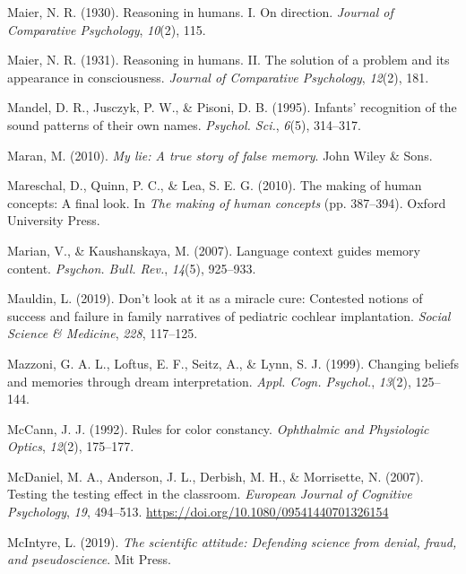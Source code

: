 \documentclass[
]{krantz}
\newlength{\cslhangindent}
\newenvironment{CSLReferences}[2] %
 {\begin{list}{}{%
  \setlength{\itemindent}{0pt}
  \setlength{\leftmargin}{0pt}
  \setlength{\parsep}{0pt}
  \ifodd #1
   \setlength{\leftmargin}{\cslhangindent}
   \setlength{\itemindent}{-1\cslhangindent}
  \fi
  \setlength{\itemsep}{#2\baselineskip}}}
 {\end{list}}
\begin{document}
\begin{CSLReferences}{1}{0}
Maier, N. R. (1930). Reasoning in humans. I. On direction. \emph{Journal of Comparative Psychology}, \emph{10}(2), 115.

Maier, N. R. (1931). Reasoning in humans. II. The solution of a problem and its appearance in consciousness. \emph{Journal of Comparative Psychology}, \emph{12}(2), 181.

Mandel, D. R., Jusczyk, P. W., \& Pisoni, D. B. (1995). Infants' recognition of the sound patterns of their own names. \emph{Psychol. Sci.}, \emph{6}(5), 314--317.

Maran, M. (2010). \emph{My lie: A true story of false memory}. John Wiley \& Sons.

Mareschal, D., Quinn, P. C., \& Lea, S. E. G. (2010). The making of human concepts: A final look. In \emph{The making of human concepts} (pp. 387--394). Oxford University Press.

Marian, V., \& Kaushanskaya, M. (2007). Language context guides memory content. \emph{Psychon. Bull. Rev.}, \emph{14}(5), 925--933.

Mauldin, L. (2019). Don't look at it as a miracle cure: Contested notions of success and failure in family narratives of pediatric cochlear implantation. \emph{Social Science \& Medicine}, \emph{228}, 117--125.

Mazzoni, G. A. L., Loftus, E. F., Seitz, A., \& Lynn, S. J. (1999). Changing beliefs and memories through dream interpretation. \emph{Appl. Cogn. Psychol.}, \emph{13}(2), 125--144.

McCann, J. J. (1992). Rules for color constancy. \emph{Ophthalmic and Physiologic Optics}, \emph{12}(2), 175--177.

McDaniel, M. A., Anderson, J. L., Derbish, M. H., \& Morrisette, N. (2007). Testing the testing effect in the classroom. \emph{European Journal of Cognitive Psychology}, \emph{19}, 494--513. \url{https://doi.org/10.1080/09541440701326154}

McIntyre, L. (2019). \emph{The scientific attitude: Defending science from denial, fraud, and pseudoscience}. Mit Press.


\end{CSLReferences}
\end{document}

